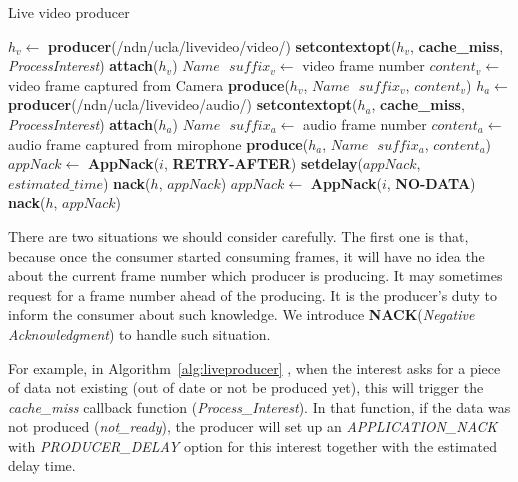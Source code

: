 \begin{algorithm}%
\caption{Live video producer}
\label{alg:liveproducer}
\begin{algorithmic}[1]
\State $h_v \leftarrow $ \textbf{producer}(/ndn/ucla/livevideo/video/)
\State \textbf{setcontextopt}($h_v$, \textbf{cache\_miss}, \textit{ProcessInterest})
\State \textbf{attach}($h_v$)
\vspace{0.2cm}
	\State $Name \textbf{ } suffix_v \leftarrow $ video frame number
	\State $content_v \leftarrow $ video frame captured from Camera
	\State \textbf{produce}($h_v$, $Name\textbf{ }suffix_v$, $content_v$)
	\EndWhile
\vspace{0.2cm}
\vspace{0.2cm}
\State $h_a \leftarrow $ \textbf{producer}(/ndn/ucla/livevideo/audio/)
\State \textbf{setcontextopt}($h_a$, \textbf{cache\_miss}, \textit{ProcessInterest})
\State \textbf{attach}($h_a$)
\vspace{0.2cm}
	\State $Name \textbf{ } suffix_a \leftarrow $ audio frame number
	\State $content_a \leftarrow $ audio frame captured from mirophone
	\State \textbf{produce}($h_a$, $Name\textbf{ }suffix_a$, $content_a$)
	\EndWhile
\vspace{0.4cm}
    \State $appNack \leftarrow $ \textbf{AppNack}($i$, \textbf{RETRY-AFTER})
    \State \textbf{setdelay}($appNack$, $estimated\_time$)
    \State \textbf{nack}($h$, $appNack$)
  \EndIf
    \State $appNack \leftarrow $ \textbf{AppNack}($i$, \textbf{NO-DATA})
    \State \textbf{nack}($h$, $appNack$)
  \EndIf
\EndFunction
\end{algorithmic}
\end{algorithm}

There are two situations we should consider carefully. The first one is that, because once the consumer started consuming frames, it will have no idea the about the current frame number which producer is producing. It may sometimes request for a frame number ahead of the producing. It is the producer's duty to inform the consumer about such knowledge. We introduce \textbf{NACK}(\textit{Negative Acknowledgment}) to handle such situation. 

For example, in Algorithm~\ref{alg:liveproducer} , when the interest asks for a piece of data not existing (out of date or not be produced yet), this will trigger the \textit{cache\_miss} callback function (\textit{Process\_Interest}). In that function, if the data was not produced (\textit{not\_ready}), the producer will set up an \textit{APPLICATION\_NACK} with \textit{PRODUCER\_DELAY} option for this interest together with the estimated delay time.

